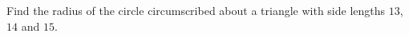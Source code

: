 Find the radius of the circle circumscribed about a triangle with side lengths $13$, $14$ and $15$.
